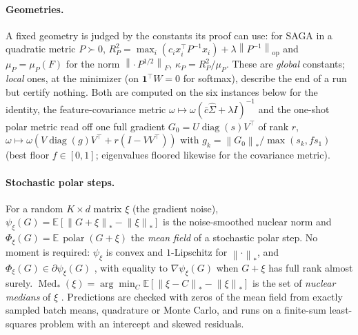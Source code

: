 \documentclass[10pt]{article}
\theoremstyle{remark}
\newcommand{\E}{\mathbb{E}}
\newcommand{\nop}[1]{\left\|#1\right\|_{\mathrm{op}}}
\newcommand{\nnuc}[1]{\left\|#1\right\|_{*}}
\newcommand{\nF}[1]{\left\|#1\right\|_{F}}
\newcommand{\diag}{\operatorname{diag}}
\newcommand{\polar}{\operatorname{polar}}
\newcommand{\Med}{\operatorname{Med}_\ast}
\newcommand{\ones}{\mathbf{1}}
\begin{document}
\paragraph{Geometries.} A fixed geometry is judged by the constants its proof can use: for SAGA in a quadratic metric
$P\succ0$, $R_P^2=\max_i(c_ix_i^\top P^{-1}x_i)+\lambda\nop{P^{-1}}$ and $\mu_P=\mu_P(F)$ for the norm $\nF{\cdot\,P^{1/2}}$,
$\kappa_P=R_P^2/\mu_P$. These are \emph{global} constants; \emph{local} ones, at the minimizer (on $\ones^\top W=0$ for
softmax), describe the end of a run but certify nothing. Both are computed on the six instances below for the identity,
the feature-covariance metric $\omega\mapsto\omega(\bar c\hat\Sigma+\lambda I)^{-1}$ \cite{yang2014data} and the one-shot
polar metric read off one full gradient $G_0=U\diag(s)V^\top$ of rank $r$, $\omega\mapsto\omega(V\diag(g)V^\top+r(I-VV^\top))$
with $g_k=\nnuc{G_0}/\max(s_k,fs_1)$ (best floor $f\in[0,1]$; eigenvalues floored likewise for the covariance metric).

\paragraph{Stochastic polar steps.}\label{sec:noisemethod} For a random $K\times d$ matrix $\xi$ (the gradient noise),
$\psi_\xi(G)=\E[\nnuc{G+\xi}-\nnuc\xi]$ is the noise-smoothed nuclear norm and $\Phi_\xi(G)=\E\,\polar(G+\xi)$ the
\emph{mean field} of a stochastic polar step. No moment is required: $\psi_\xi$ is convex and $1$-Lipschitz for
$\nnuc\cdot$, and $\Phi_\xi(G)\in\partial\psi_\xi(G)$ \cite{duchi2012randomized,jiang2026adaptive}, with equality to
$\nabla\psi_\xi(G)$ when $G+\xi$ has full rank almost surely. $\Med(\xi)=\arg\min_C\E[\nnuc{\xi-C}-\nnuc\xi]$ is the set of
\emph{nuclear medians} of $\xi$ \cite{minsker2015geometric}. Predictions are checked with zeros of the mean field from
exactly sampled batch means, quadrature or Monte Carlo, and runs on a finite-sum least-squares problem with an intercept
and skewed residuals.
\end{document}
